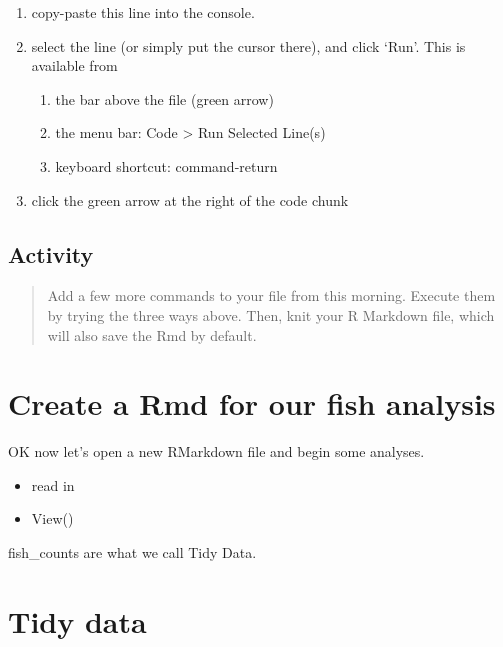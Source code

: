 \documentclass[]{book}
\providecommand{\tightlist}{%
  \setlength{\itemsep}{0pt}\setlength{\parskip}{0pt}}
\begin{document}
\begin{enumerate}
\def\labelenumi{\arabic{enumi}.}
\tightlist
\item
  copy-paste this line into the console.
\item
  select the line (or simply put the cursor there), and click `Run'. This is available from

  \begin{enumerate}
  \def\labelenumii{\alph{enumii}.}
  \tightlist
  \item
    the bar above the file (green arrow)
  \item
    the menu bar: Code \textgreater{} Run Selected Line(s)
  \item
    keyboard shortcut: command-return
  \end{enumerate}
\item
  click the green arrow at the right of the code chunk
\end{enumerate}

\hypertarget{activity-3}{%
\subsection{Activity}\label{activity-3}}

\begin{quote}
Add a few more commands to your file from this morning. Execute them by trying the three ways above. Then, knit your R Markdown file, which will also save the Rmd by default.
\end{quote}

\hypertarget{create-a-rmd-for-our-fish-analysis}{%
\section{Create a Rmd for our fish analysis}\label{create-a-rmd-for-our-fish-analysis}}

OK now let's open a new RMarkdown file and begin some analyses.

\begin{itemize}
\tightlist
\item
  read in
\item
  View()
\end{itemize}

fish\_counts are what we call Tidy Data.

\hypertarget{tidy-data}{%
\section{Tidy data}\label{tidy-data}}
\end{document}
